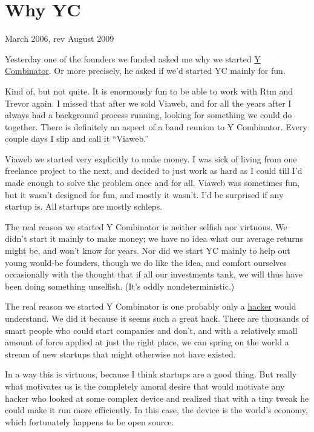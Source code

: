 \chapter{Why YC}

March 2006, rev August 2009

Yesterday one of the founders we funded asked me why we started
\href{http://ycombinator.com}{Y Combinator}. Or more precisely, he asked
if we'd started YC mainly for fun.

Kind of, but not quite. It is enormously fun to be able to work with Rtm
and Trevor again. I missed that after we sold Viaweb, and for all the
years after I always had a background process running, looking for
something we could do together. There is definitely an aspect of a band
reunion to Y Combinator. Every couple days I slip and call it
``Viaweb.''

Viaweb we started very explicitly to make money. I was sick of living
from one freelance project to the next, and decided to just work as hard
as I could till I'd made enough to solve the problem once and for all.
Viaweb was sometimes fun, but it wasn't designed for fun, and mostly it
wasn't. I'd be surprised if any startup is. All startups are mostly
schleps.

The real reason we started Y Combinator is neither selfish nor virtuous.
We didn't start it mainly to make money; we have no idea what our
average returns might be, and won't know for years. Nor did we start YC
mainly to help out young would-be founders, though we do like the idea,
and comfort ourselves occasionally with the thought that if all our
investments tank, we will thus have been doing something unselfish.
(It's oddly nondeterministic.)

The real reason we started Y Combinator is one probably only a
\href{gba.html}{hacker} would understand. We did it because it seems
such a great hack. There are thousands of smart people who could start
companies and don't, and with a relatively small amount of force applied
at just the right place, we can spring on the world a stream of new
startups that might otherwise not have existed.

In a way this is virtuous, because I think startups are a good thing.
But really what motivates us is the completely amoral desire that would
motivate any hacker who looked at some complex device and realized that
with a tiny tweak he could make it run more efficiently. In this case,
the device is the world's economy, which fortunately happens to be open
source.